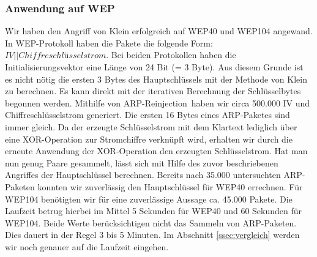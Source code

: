 \documentclass[10pt,a4paper]{article}
\begin{document}
\subsubsection{Anwendung auf WEP}
Wir haben den Angriff von Klein erfolgreich auf WEP40 und WEP104 angewand.
In WEP-Protokoll haben die Pakete die folgende Form: $IV || Chiffreschlüsselstrom $. Bei beiden Protokollen haben die Initialisierungsvektor eine Länge von 24 Bit (= 3 Byte). Aus diesem Grunde ist es nicht nötig die ersten 3 Bytes des Hauptschlüssels mit der Methode von Klein zu berechnen. Es kann direkt mit der iterativen Berechnung der Schlüsselbytes begonnen werden. Mithilfe von \glqq ARP-Reinjection\grqq\ haben wir circa 500.000 IV und Chiffreschlüsselstrom generiert. Die ersten 16 Bytes eines ARP-Paketes sind immer gleich. Da der erzeugte Schlüsselstrom mit dem Klartext lediglich über eine XOR-Operation zur Stromchiffre verknüpft wird, erhalten wir durch die erneute Anwendung der XOR-Operation den erzeugten Schlüsselstrom. Hat man nun genug Paare gesammelt, lässt sich mit Hilfe des zuvor beschriebenen Angriffes der Hauptschlüssel berechnen. Bereits nach 35.000 untersuchten ARP-Paketen konnten wir zuverlässig den Hauptschlüssel für WEP40 errechnen. Für WEP104 benötigten wir für eine zuverlässige Aussage ca. 45.000 Pakete. Die Laufzeit betrug hierbei im Mittel 5 Sekunden für WEP40 und 60 Sekunden für WEP104. Beide Werte berücksichtigen nicht das Sammeln von ARP-Paketen. Dies dauert in der Regel 3 bis 5 Minuten. Im Abschnitt \ref{ssec:vergleich} werden wir noch genauer auf die Laufzeit eingehen.
\end{document}
